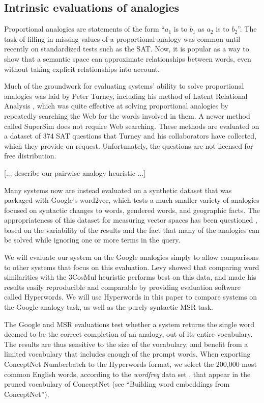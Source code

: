 \documentclass[letterpaper]{article}
\begin{document}
\subsection{Intrinsic evaluations of analogies}

Proportional analogies are statements of the form ``$a_1$ is to $b_1$ as $a_2$
is to $b_2$''. The task of filling in missing values of a proportional analogy
was common until recently on standardized tests such as the SAT. Now, it is
popular as a way to show that a semantic space can approximate relationships
between words, even without taking explicit relationships into account.

Much of the groundwork for evaluating systems' ability to solve proportional
analogies was laid by Peter Turney, including his method of Latent Relational
Analysis \cite{turney2005lra}, which was quite effective at solving
proportional analogies by repeatedly searching the Web for the words involved
in them.  A newer method called SuperSim \cite{turney2013distributional} does
not require Web searching. These methods are evaluated on a dataset of 374 SAT
questions that Turney and his collaborators have collected, which they provide
on request.  Unfortunately, the questions are not licensed for free
distribution.

[... describe our pairwise analogy heuristic ...]

Many systems now are instead evaluated on a synthetic dataset that was packaged
with Google's word2vec, which tests a much smaller variety of analogies focused
on syntactic changes to words, gendered words, and geographic facts. The
appropriateness of this dataset for measuring vector spaces has been questioned
\cite{linzen2016issues}, based on the variability of the results and the fact
that many of the analogies can be solved while ignoring one or more terms in
the query.

We will evaluate our system on the Google analogies simply to allow comparisons
to other systems that focus on this evaluation. Levy showed that comparing word
similarities with the 3CosMul heuristic \cite{levy2015embeddings} performs best
on this data, and made his results easily reproducible and comparable by
providing evaluation software called Hyperwords. We will use Hyperwords in this
paper to compare systems on the Google analogy task, as well as the purely
syntactic MSR task.

The Google and MSR evaluations test whether a system returns the single word
deemed to be the correct completion of an analogy, out of its entire
vocabulary. The results are thus sensitive to the size of the vocabulary, and
benefit from a limited vocabulary that includes enough of the prompt words.
When exporting ConceptNet Numberbatch to the Hyperwords format, we select the
200,000 most common English words, according to the \emph{wordfreq} data set
\cite{speer2016wordfreq}, that appear in the pruned vocabulary of ConceptNet
(see ``Building word embeddings from ConceptNet'').
\end{document}
